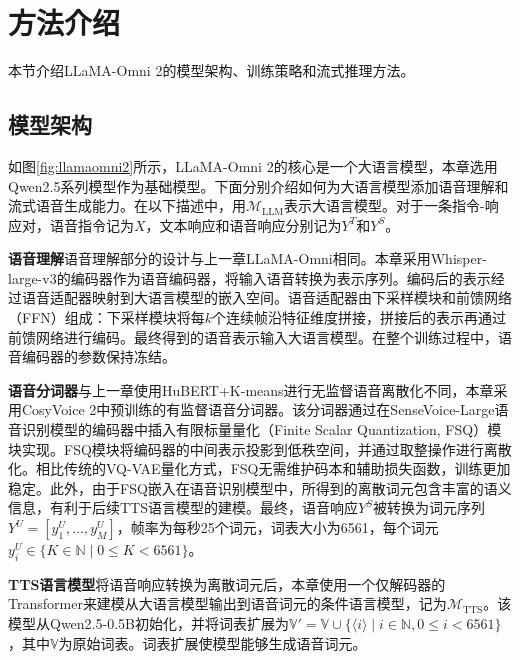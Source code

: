 \section{方法介绍}

本节介绍LLaMA-Omni 2的模型架构、训练策略和流式推理方法。

\subsection{模型架构}

如图\ref{fig:llamaomni2}所示，LLaMA-Omni 2的核心是一个大语言模型，本章选用Qwen2.5系列模型作为基础模型。下面分别介绍如何为大语言模型添加语音理解和流式语音生成能力。在以下描述中，用$\mathcal{M}_\text{LLM}$表示大语言模型。对于一条指令-响应对，语音指令记为$X$，文本响应和语音响应分别记为$Y^T$和$Y^S$。



\textbf{语音理解}\quad 语音理解部分的设计与上一章LLaMA-Omni相同。本章采用Whisper-large-v3\citep{whisper}的编码器作为语音编码器，将输入语音转换为表示序列。编码后的表示经过语音适配器映射到大语言模型的嵌入空间。语音适配器由下采样模块和前馈网络（FFN）组成：下采样模块将每$k$个连续帧沿特征维度拼接，拼接后的表示再通过前馈网络进行编码。最终得到的语音表示输入大语言模型。在整个训练过程中，语音编码器的参数保持冻结。

\textbf{语音分词器}\quad 与上一章使用HuBERT+K-means进行无监督语音离散化不同，本章采用CosyVoice 2\citep{du2024cosyvoice}中预训练的有监督语音分词器。该分词器通过在SenseVoice-Large\citep{an2024funaudiollm}语音识别模型的编码器中插入有限标量量化（Finite Scalar Quantization, FSQ）\citep{mentzer2024finite}模块实现。FSQ模块将编码器的中间表示投影到低秩空间，并通过取整操作进行离散化。相比传统的VQ-VAE量化方式，FSQ无需维护码本和辅助损失函数，训练更加稳定。此外，由于FSQ嵌入在语音识别模型中，所得到的离散词元包含丰富的语义信息，有利于后续TTS语言模型的建模。最终，语音响应$Y^S$被转换为词元序列$Y^U = [y^U_1, \ldots, y^U_M]$，帧率为每秒25个词元，词表大小为6561，每个词元$y^U_i \in \{K \in \mathbb{N} \mid 0 \leq K < 6561\}$。

\textbf{TTS语言模型}\quad 将语音响应转换为离散词元后，本章使用一个仅解码器的Transformer\citep{transformer}来建模从大语言模型输出到语音词元的条件语言模型，记为$\mathcal{M}_\text{TTS}$。该模型从Qwen2.5-0.5B初始化，并将词表扩展为$\mathbb{V}' = \mathbb{V} \cup \{ \langle i \rangle \mid i \in \mathbb{N}, 0 \leq i < 6561 \}$，其中$\mathbb{V}$为原始词表。词表扩展使模型能够生成语音词元。


